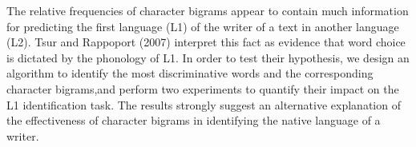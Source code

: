 The relative frequencies of character bigrams appear to contain much information for predicting the first language (L1) of the writer of a text in another language (L2). Tsur and Rappoport (2007) interpret this fact as evidence that word choice is dictated by the phonology of L1. In order to test their hypothesis, we design an algorithm to identify the most discriminative words and the corresponding character bigrams,and perform two experiments to quantify their impact on the L1 identification task. The results strongly suggest an alternative explanation of the effectiveness of character bigrams in identifying the native language of a writer.
